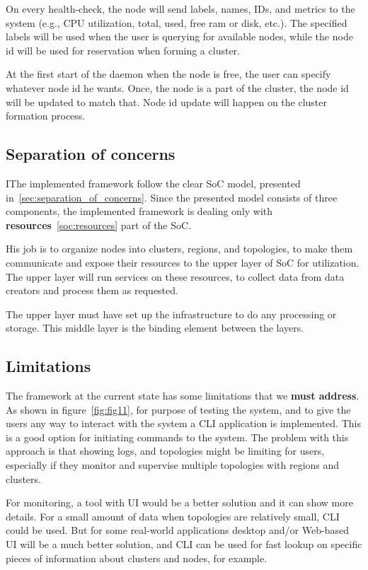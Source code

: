 On every health-check, the node will send labels, names, IDs, and metrics to the system (e.g., CPU utilization, total, used, free ram or disk, etc.). The specified labels will be used when the user is querying for available nodes, while the node id will be used for reservation when forming a cluster.

At the first start of the daemon when the node is free, the user can specify whatever node id he wants. Once, the node is a part of the cluster, the node id will be updated to match that. Node id update will happen on the cluster formation process.
%
%
\subsection{Separation of concerns}\label{sec:framework_SoC}
%
IThe implemented framework follow the clear SoC model, presented in~\ref{sec:separation_of_concerns}. Since the presented model consists of three components, the implemented framework is dealing only with \textbf{resources}~\ref{soc:resources} part of the SoC. 

His job is to organize nodes into clusters, regions, and topologies, to make them communicate and expose their resources to the upper layer of SoC for utilization. The upper layer will run services on these resources, to collect data from data creators and process them as requested.

The upper layer must have set up the infrastructure to do any processing or storage. This middle layer is the binding element between the layers.
%
%
\subsection{Limitations}\label{sec:framework_limits}
% 
The framework at the current state has some limitations that we \textbf{must address}. As shown in figure~\ref{fig:fig11}, for purpose of testing the system, and to give the users any way to interact with the system a CLI application is implemented. This is a good option for initiating commands to the system. The problem with this approach is that showing logs, and topologies might be limiting for users, especially if they monitor and supervise multiple topologies with regions and clusters.

For monitoring, a tool with UI would be a better solution and it can show more details. For a small amount of data when topologies are relatively small, CLI could be used. But for some real-world applications desktop and/or Web-based UI will be a much better solution, and CLI can be used for fast lookup on specific pieces of information about clusters and nodes, for example.


